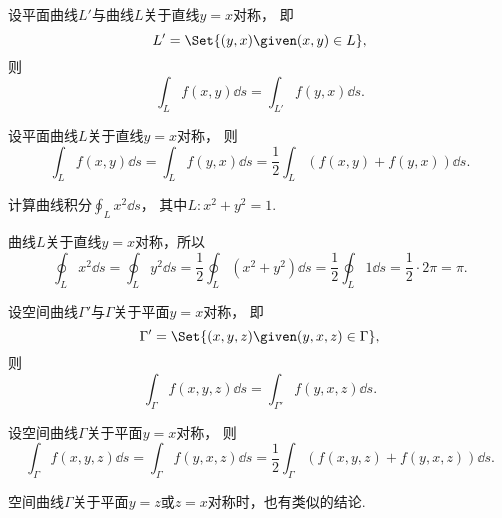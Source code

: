
设平面曲线\(L'\)与曲线\(L\)关于直线\(y=x\)对称，
即\[
	L' = \Set{ (y,x) \given (x,y) \in L },
\]
则\[
	\int_L f(x,y) \dd{s}
	= \int_{L'} f(y,x) \dd{s}.
\]

设平面曲线\(L\)关于直线\(y=x\)对称，
则\[
	\int_L f(x,y) \dd{s}
	= \int_L f(y,x) \dd{s}
	= \frac12 \int_L (f(x,y) + f(y,x)) \dd{s}.
\]

\begin{example}
计算曲线积分\(\oint_L x^2 \dd{s}\)，
其中\(L: x^2+y^2=1\).
\begin{solution}
曲线\(L\)关于直线\(y=x\)对称，所以\[
	\oint_L x^2 \dd{s}
	= \oint_L y^2 \dd{s}
	= \frac12 \oint_L (x^2+y^2) \dd{s}
	= \frac12 \oint_L 1 \dd{s}
	= \frac12 \cdot 2\pi
	= \pi.
\]
\end{solution}
\end{example}

设空间曲线\(\Gamma'\)与\(\Gamma\)关于平面\(y=x\)对称，
即\[
	\Gamma' = \Set{ (x,y,z) \given (y,x,z) \in \Gamma },
\]
则\[
	\int_\Gamma f(x,y,z) \dd{s}
	= \int_{\Gamma'} f(y,x,z) \dd{s}.
\]

设空间曲线\(\Gamma\)关于平面\(y=x\)对称，
则\[
	\int_\Gamma f(x,y,z) \dd{s}
	= \int_\Gamma f(y,x,z) \dd{s}
	= \frac12 \int_\Gamma (f(x,y,z) + f(y,x,z)) \dd{s}.
\]

空间曲线\(\Gamma\)关于平面\(y=z\)或\(z=x\)对称时，也有类似的结论.
